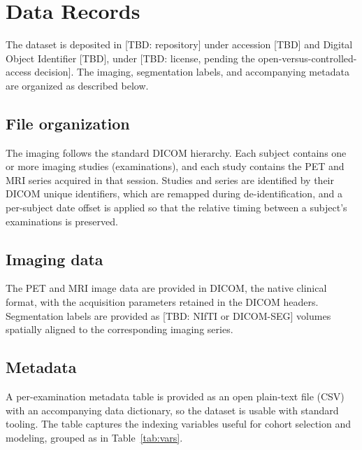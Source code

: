 
\section*{Data Records}\label{sec:datarecords}

The dataset is deposited in [TBD: repository] under accession [TBD] and Digital Object Identifier [TBD], under [TBD: license, pending the open-versus-controlled-access decision].
The imaging, segmentation labels, and accompanying metadata are organized as described below.

\subsection*{File organization}\label{subsec:layout}
The imaging follows the standard DICOM hierarchy.
Each subject contains one or more imaging studies (examinations), and each study contains the PET and MRI series acquired in that session.
Studies and series are identified by their DICOM unique identifiers, which are remapped during de-identification, and a per-subject date offset is applied so that the relative timing between a subject's examinations is preserved.

\subsection*{Imaging data}\label{subsec:imaging}
The PET and MRI image data are provided in DICOM, the native clinical format, with the acquisition parameters retained in the DICOM headers.
Segmentation labels are provided as [TBD: NIfTI or DICOM-SEG] volumes spatially aligned to the corresponding imaging series.

\subsection*{Metadata}\label{subsec:metadata}
A per-examination metadata table is provided as an open plain-text file (CSV) with an accompanying data dictionary, so the dataset is usable with standard tooling.
The table captures the indexing variables useful for cohort selection and modeling, grouped as in Table~\ref{tab:vars}.

